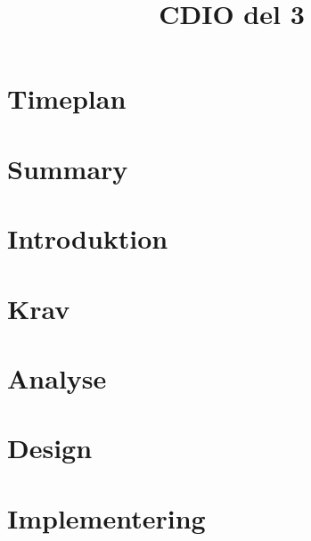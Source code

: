 \documentclass[12pt,oneside,a4paper,english]{article}
\title{CDIO del 3} %
\begin{document}



\newpage
{} 


\section{Timeplan} \label{ch1}
 

\section{Summary} \label{ch2}



\newpage
{}
\doublespacing
\renewcommand{\baselinestretch}{1}\normalsize
\tableofcontents
\renewcommand{\baselinestretch}{1}\normalsize
\thispagestyle{fancy} %



\newpage
{}
\section{Introduktion} \label{ch3}
 


\section{Krav} \label{ch4}
 

\newpage
{}
\section{Analyse} \label{ch5}
 

\newpage
{}
\section{Design} \label{ch6}


\newpage
{}
\section{Implementering} \label{ch7}

\end{document}
